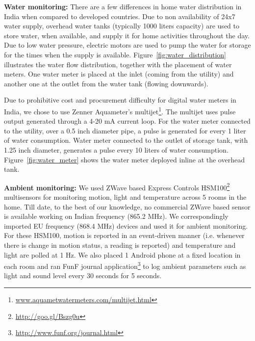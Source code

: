 \documentclass[10pt]{sensys-proc}
\newcommand{\figref}[1]{Figure~\ref{#1}}
\begin{document}
\noindent \textbf{Water monitoring:} There are a few differences in home water distribution in India when compared to developed countries. Due to non availability of 24x7 water supply, overhead water tanks (typically 1000 liters capacity) are used to store water, when available, and supply it for home activities throughout the day. Due to low water pressure, electric motors are used to pump the water for storage for the times when the supply is available. %
\figref{fig:water_distribution} illustrates the water flow distribution, together with the placement of water meters. One water meter is placed at the inlet (coming from the utility) and another one at the outlet from the water tank (flowing downwards). %

Due to prohibitive cost and procurement difficulty for digital water meters in India, we chose to use Zenner Aquameter's multijet\footnote{\url{www.aquametwatermeters.com/multijet.html}}. The multijet uses pulse output generated through a 4-20 mA current loop. 
For the water meter connected to the utility, over a 0.5 inch diameter pipe, a pulse is generated for every 1 liter of water consumption. Water meter connected to the outlet of storage tank, with 1.25 inch diameter, generates a pulse every 10 liters of water consumption. %
\figref{fig:water_meter} shows the water meter deployed inline at the overhead tank.

\noindent \textbf{Ambient monitoring:} We used ZWave based Express Controls HSM100\footnote{\url{http://goo.gl/Bszg0u}} multisensors for monitoring motion, light and temperature across 5 rooms in the home. Till date, to the best of our knowledge, no commercial ZWave based sensor is available working on Indian frequency (865.2 MHz). We correspondingly imported EU frequency (868.4 MHz) devices and used it for ambient monitoring. For these HSM100, motion is reported in an event-driven manner (i.e. whenever there is change in motion status, a reading is reported) and temperature and light are polled at 1 Hz. We also placed 1 Android phone at a fixed location in each room and ran FunF journal application\footnote{\url{http://www.funf.org/journal.html}} to log ambient parameters such as light and sound level every 30 seconds for 5 seconds.
\end{document}

